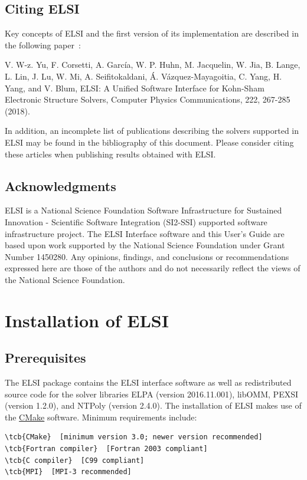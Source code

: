 \documentclass{report}
\newcommand{\tcb}[1]{\textcolor{blue}{#1}}
\begin{document}
\section{Citing ELSI}
\label{sec:cite}
Key concepts of ELSI and the first version of its implementation are described in the following paper~\cite{elsi_yu_2018}:

V. W-z. Yu, F. Corsetti, A. Garc\'{i}a, W. P. Huhn, M. Jacquelin, W. Jia, B. Lange, L. Lin, J. Lu, W. Mi, A. Seifitokaldani, \'{A}. V\'{a}zquez-Mayagoitia, C. Yang, H. Yang, and V. Blum, ELSI: A Unified Software Interface for Kohn-Sham Electronic Structure Solvers, Computer Physics Communications, 222, 267-285 (2018).

In addition, an incomplete list of publications describing the solvers supported in ELSI may be found in the bibliography of this document. Please consider citing these articles when publishing results obtained with ELSI.

\section{Acknowledgments}
\label{sec:thanks}
ELSI is a National Science Foundation Software Infrastructure for Sustained Innovation - Scientific Software Integration (SI2-SSI) supported software infrastructure project. The ELSI Interface software and this User's Guide are based upon work supported by the National Science Foundation under Grant Number 1450280. Any opinions, findings, and conclusions or recommendations expressed here are those of the authors and do not necessarily reflect the views of the National Science Foundation.

\chapter{Installation of ELSI}
\section{Prerequisites}
\label{sec:prereq}
The ELSI package contains the ELSI interface software as well as redistributed source code for the solver libraries ELPA (version 2016.11.001), libOMM, PEXSI (version 1.2.0), and NTPoly (version 2.4.0). The installation of ELSI makes use of the \href{http://cmake.org}{CMake} software. Minimum requirements include:
\begin{Verbatim}[commandchars=\\\{\}]
\tcb{CMake}  [minimum version 3.0; newer version recommended]
\tcb{Fortran compiler}  [Fortran 2003 compliant]
\tcb{C compiler}  [C99 compliant]
\tcb{MPI}  [MPI-3 recommended]
\end{Verbatim}
\end{document}
